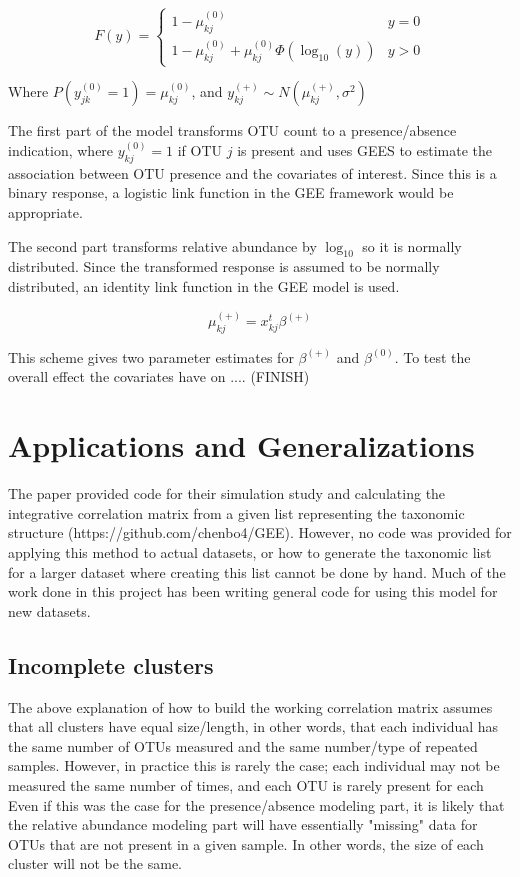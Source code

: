 \documentclass[12pt]{article}
\begin{document}
$$F(y) = \begin{cases}
  1 - \mu_{kj}^{(0)} & y = 0\\
  1 - \mu_{kj}^{(0)} + \mu_{kj}^{(0)}\Phi(\log_{10}(y)) & y > 0
\end{cases}
$$

Where $P(y_{jk}^{(0)} = 1) = \mu_{kj}^{(0)}$, and $y_{kj}^{(+)} \sim N(\mu_{kj}^{(+)}, \sigma^2)$

The first part of the model transforms OTU count to a presence/absence indication, where $y_{kj}^{(0)} = 1$ if OTU $j$ is present and uses GEES to estimate the association between OTU presence and the covariates of interest. Since this is a binary response, a logistic link function in the GEE framework would be appropriate.

The second part transforms relative abundance by $\log_{10}$ so it is normally distributed. Since the transformed response is assumed to be normally distributed, an identity link function in the GEE model is used.

$$\mu_{kj}^{(+)} = x_{kj}^t \beta^{(+)}$$


This scheme gives two parameter estimates for $\beta^{(+)}$ and $\beta^{(0)}$. To test the overall effect the covariates have on .... (FINISH)



\section{Applications and Generalizations}

The paper provided code for their simulation study and calculating the integrative correlation matrix from a given list representing the taxonomic structure (https://github.com/chenbo4/GEE). However, no code was provided for applying this method to actual datasets, or how to generate the taxonomic list for a larger dataset where creating this list cannot be done by hand. Much of the work done in this project has been writing general code for using this model for new datasets.

\subsection{Incomplete clusters}
The above explanation of how to build the working correlation matrix assumes that all clusters have equal size/length, in other words, that each individual has the same number of OTUs measured and the same number/type of repeated samples. However, in practice this is rarely the case; each individual may not be measured the same number of times, and each OTU is rarely present for each  Even if this was the case for the presence/absence modeling part, it is likely that the relative abundance modeling part will have essentially "missing" data for OTUs that are not present in a given sample. In other words, the size of each cluster will not be the same.
\end{document}
